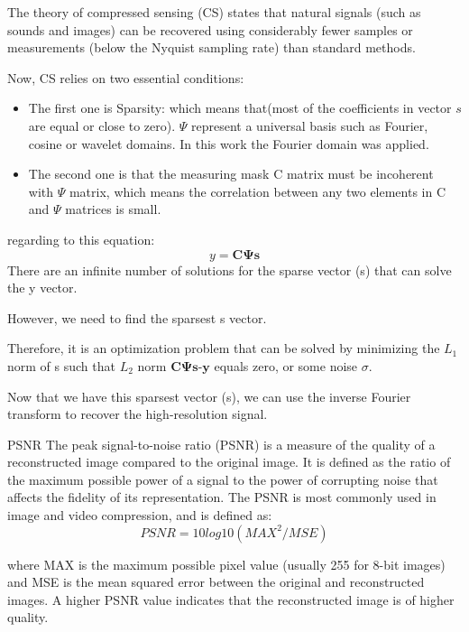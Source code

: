 \documentclass[10pt,aspectratio=169,dvipsnames]{beamer} %
\newcommand{\bs}[1]{\boldsymbol{#1}}
\begin{document}
	\note
	{	
		\tiny
		The theory of compressed sensing (CS) states that natural signals (such as sounds and images) can be recovered using considerably fewer samples or measurements (below the Nyquist sampling rate) than standard methods.
		
		Now, CS relies on two essential conditions: 	
		\begin{itemize}
			\item The first one is Sparsity: which means that(\alert{most of the coefficients in vector \(s\) are equal or close to zero}).
			$\Psi$ represent a universal basis such as Fourier, cosine or wavelet domains.
			In this work the Fourier domain was applied. 
			\item The second one is that the measuring mask C matrix must be incoherent with \(\Psi\) matrix, which means the correlation between any two elements in C and $\Psi$ matrices is small.
		\end{itemize}		
		
		regarding to this equation: 
		\begin{equation}
			y = \bs{C}\bs{\Psi}\bs{s}
		\end{equation}
		There are an infinite number of solutions for the sparse vector (s) that can solve the y vector.
		
		However, we need to find the sparsest s vector.
		
		Therefore, it is an optimization problem that can be solved by minimizing the \(L_1\) norm of s such that \(L_2\) norm \(\bs{C}\bs{\Psi}\bs{s}\)-\(\bs{y}\) equals zero, or some noise $\sigma$.
		
		Now that we have this sparsest vector (s), we can use the inverse Fourier transform to recover the high-resolution signal.		
		
	}
	\begin{frame}{PSNR}
		The peak signal-to-noise ratio (PSNR) is a measure of the quality of a reconstructed image compared to the original image. 
		It is defined as the ratio of the maximum possible power of a signal to the power of corrupting noise that affects the fidelity of its representation. 
		The PSNR is most commonly used in image and video compression, and is defined as: 
		\begin{equation}
			PSNR = 10log10(MAX^2 / MSE) 
		\end{equation}
		
		where MAX is the maximum possible pixel value (usually 255 for 8-bit images) and MSE is the mean squared error between the original and reconstructed images.
		A higher PSNR value indicates that the reconstructed image is of higher quality.
	\end{frame}
\end{document}
